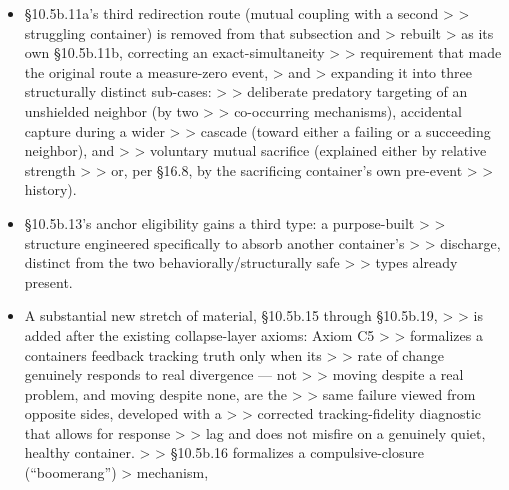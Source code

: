 \documentclass[
]{article}
\begin{document}
\begin{itemize}
  threshold, and no effect once the threshold is \textgreater{} passed);
  the second \textgreater{} is a named exception to §8.8a.ii's
  \textgreater{} ordinarily-undirected frantic \textgreater{} striking,
  for a container with \textgreater{} enough warning to aim its
  discharge \textgreater{} deliberately.
\item
  §10.5b.11a's third redirection route (mutual coupling with a second
  \textgreater{} \textgreater{} struggling container) is removed from
  that subsection and \textgreater{} rebuilt \textgreater{} as its own
  §10.5b.11b, correcting an exact-simultaneity \textgreater{}
  \textgreater{} requirement that made the original route a measure-zero
  event, \textgreater{} and \textgreater{} expanding it into three
  structurally distinct sub-cases: \textgreater{} \textgreater{}
  deliberate predatory targeting of an unshielded neighbor (by two
  \textgreater{} \textgreater{} co-occurring mechanisms), accidental
  capture during a wider \textgreater{} \textgreater{} cascade (toward
  either a failing or a succeeding neighbor), and \textgreater{}
  \textgreater{} voluntary mutual sacrifice (explained either by
  relative strength \textgreater{} \textgreater{} or, per §16.8, by the
  sacrificing container's own pre-event \textgreater{} \textgreater{}
  history).
\item
  §10.5b.13's anchor eligibility gains a third type: a purpose-built
  \textgreater{} \textgreater{} structure engineered specifically to
  absorb another container's \textgreater{} \textgreater{} discharge,
  distinct from the two behaviorally/structurally safe \textgreater{}
  \textgreater{} types already present.
\item
  A substantial new stretch of material, §10.5b.15 through §10.5b.19,
  \textgreater{} \textgreater{} is added after the existing
  collapse-layer axioms: Axiom C5 \textgreater{} \textgreater{}
  formalizes a container\textquotesingle s feedback tracking truth only
  when its \textgreater{} \textgreater{} rate of change genuinely
  responds to real divergence --- not \textgreater{} \textgreater{}
  moving despite a real problem, and moving despite none, are the
  \textgreater{} \textgreater{} same failure viewed from opposite sides,
  developed with a \textgreater{} \textgreater{} corrected
  tracking-fidelity diagnostic that allows for response \textgreater{}
  \textgreater{} lag and does not misfire on a genuinely quiet, healthy
  container. \textgreater{} \textgreater{} §10.5b.16 formalizes a
  compulsive-closure (``boomerang'') \textgreater{} mechanism,

\end{itemize}
\end{document}
